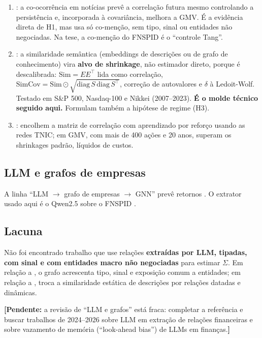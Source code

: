 \documentclass[11pt,a4paper]{article}
\newcommand{\pend}[1]{\textcolor{red!70!black}{\textbf{[Pendente:} #1\textbf{]}}}
\begin{document}
\begin{enumerate}
  \item \citet{tang2019}: a co-ocorrência em notícias prevê a correlação futura mesmo controlando a
        persistência e, incorporada à covariância, melhora a GMV. É a evidência direta de H1, mas usa só
        co-menção, sem tipo, sinal ou entidades não negociadas. Na tese, a co-menção do FNSPID é o
        ``controle Tang''.
  \item \citet{becquin2023}: a similaridade semântica (embeddings de descrições ou de grafo de
        conhecimento) vira \textbf{alvo de shrinkage}, não estimador direto, porque é descalibrada:
        $\mathrm{Sim}=EE^\top$ lida como correlação, $\mathrm{SimCov}=\mathrm{Sim}\odot\sqrt{\mathrm{diag}\,S\,\mathrm{diag}\,S^\top}$,
        correção de autovalores e $\delta$ à Ledoit-Wolf. Testado em S\&P 500, Nasdaq-100 e Nikkei
        (2007--2023). \textbf{É o molde técnico seguido aqui.} Formulam também a hipótese de regime
        (H3).
  \item \citet{lu2024}: encolhem a matriz de correlação com aprendizado por reforço usando as redes
        TNIC; em GMV, com mais de 400 ações e 20 anos, superam os shrinkages padrão, líquidos de custos.
\end{enumerate}

\subsection{LLM e grafos de empresas}

A linha ``LLM $\to$ grafo de empresas $\to$ GNN'' prevê retornos \citep[entre outros]{zhou2025}. O
extrator usado aqui é o Qwen2.5 \citep{qwen2024} sobre o FNSPID \citep{dong2024fnspid}.

\subsection{Lacuna}\label{sec:lacuna}

Não foi encontrado trabalho que use relações \textbf{extraídas por LLM, tipadas, com sinal e com
entidades macro não negociadas} para estimar $\Sigma$. Em relação a \citet{tang2019}, o grafo
acrescenta tipo, sinal e exposição comum a entidades; em relação a \citet{becquin2023}, troca a
similaridade estática de descrições por relações datadas e dinâmicas.

\pend{a revisão de ``LLM e grafos'' está fraca: completar a referência \citet{zhou2025} e buscar
trabalhos de 2024--2026 sobre LLM em extração de relações financeiras e sobre vazamento de memória
(``look-ahead bias'') de LLMs em finanças.}
\end{document}

